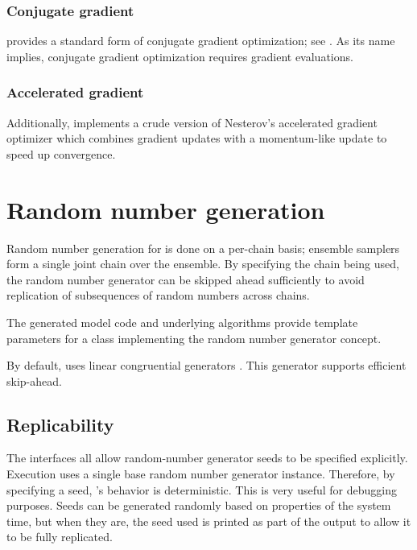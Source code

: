 \documentclass[article]{jss}
\begin{document}
\subsubsection{Conjugate gradient}

 provides a standard form of conjugate gradient
optimization; see \citep{NocedalWright:2006}.  As its name implies,
conjugate gradient optimization requires gradient evaluations.

\subsubsection{Accelerated gradient}

Additionally,  implements a crude version of Nesterov's
accelerated gradient optimizer \cite{Nesterov:1983} which combines
gradient updates with a momentum-like update to speed up convergence.

\section{Random number generation}\label{rng.section}

Random number generation for  is done on a per-chain
basis; ensemble samplers form a single joint chain over the ensemble.  By
specifying the chain being used, the random number generator can be
skipped ahead sufficiently to avoid replication of subsequences of
random numbers across chains.

The generated model code and underlying  algorithms
provide template parameters for a class implementing the 
random number generator concept.  

By default,  uses linear congruential generators
\citep{LEcuyer:1988}.  This generator supports efficient skip-ahead.

\subsection{Replicability}

The  interfaces all allow random-number generator seeds
to be specified explicitly.  Execution uses a single base random
number generator instance.  Therefore, by specifying a seed,
's behavior is deterministic.  This is very useful for
debugging purposes.  Seeds can be generated randomly based on
properties of the system time, but when they are, the seed used is
printed as part of the output to allow it to be fully replicated.
\end{document}
